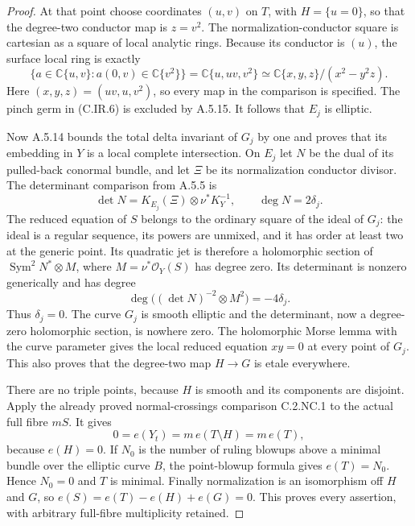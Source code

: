 \begin{proof}
At that point choose coordinates $(u,v)$ on $T$, with
$H=\{u=0\}$, so that the degree-two conductor map is
$z=v^2$. The normalization-conductor square is cartesian
as a square of local analytic rings. Because its conductor
is $(u)$, the surface local ring is exactly
\[
 \{a\in\mathbb C\{u,v\}:a(0,v)\in\mathbb C\{v^2\}\}
   =\mathbb C\{u,uv,v^2\}
   \simeq\mathbb C\{x,y,z\}/(x^2-y^2z).       \tag{C.IR.6}
\]
Here $(x,y,z)=(uv,u,v^2)$, so every map in the comparison
is specified. The pinch germ in (C.IR.6) is excluded by
A.5.15. It follows that $E_j$ is elliptic.

Now A.5.14 bounds the total delta invariant of $G_j$ by one
and proves that its embedding in $Y$ is a local complete
intersection. On $E_j$ let $N$ be the dual of its pulled-back
conormal bundle, and let $\Xi$ be its normalization conductor
divisor. The determinant comparison from A.5.5 is
\[
 \det N=K_{E_j}(\Xi)\otimes\nu^*K_Y^{-1},
 \qquad \deg N=2\delta_j.                       \tag{C.IR.7}
\]
The reduced equation of $S$ belongs to the ordinary square
of the ideal of $G_j$: the ideal is a regular sequence,
its powers are unmixed, and it has order at least two at
the generic point. Its quadratic jet is therefore a
holomorphic section of $\operatorname{Sym}^2N^*\otimes M$,
where $M=\nu^*\mathcal O_Y(S)$ has degree zero. Its determinant
is nonzero generically and has degree
\[
 \deg\bigl((\det N)^{-2}\otimes M^2\bigr)
                         =-4\delta_j.           \tag{C.IR.8}
\]
Thus $\delta_j=0$. The curve $G_j$ is smooth elliptic and
the determinant, now a degree-zero holomorphic section,
is nowhere zero. The holomorphic Morse lemma with the
curve parameter gives the local reduced equation $xy=0$
at every point of $G_j$. This also proves that the
degree-two map $H\to G$ is etale everywhere.

There are no triple points, because $H$ is smooth and its
components are disjoint. Apply the already proved
normal-crossings comparison C.2.NC.1 to the actual full
fibre $mS$. It gives
\[
 0=e(Y_t)=m\,e(T\setminus H)=m\,e(T),            \tag{C.IR.9}
\]
because $e(H)=0$. If $N_0$ is the number of ruling blowups
above a minimal bundle over the elliptic curve $B$, the
point-blowup formula gives $e(T)=N_0$. Hence $N_0=0$ and
$T$ is minimal. Finally normalization is an isomorphism
off $H$ and $G$, so
$e(S)=e(T)-e(H)+e(G)=0$. This proves every assertion,
with arbitrary full-fibre multiplicity retained.
\end{proof}

